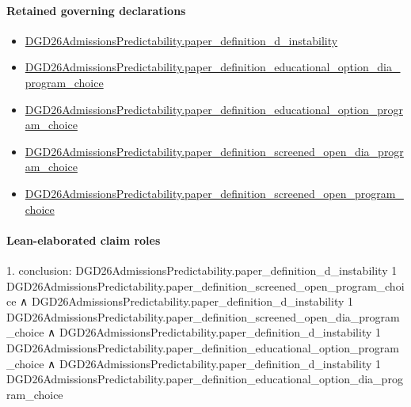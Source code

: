 \documentclass[10pt]{article}
\begin{document}
\paragraph{Retained governing declarations}
\begin{itemize}\raggedright
\item \hyperlink{governing-declaration-ce2c1c7a5233a84a}{DGD26\allowbreak{}Admissions\allowbreak{}Predictability.\allowbreak{}paper\_\allowbreak{}definition\_\allowbreak{}d\_\allowbreak{}instability}
\item \hyperlink{governing-declaration-9292267e580ba2d6}{DGD26\allowbreak{}Admissions\allowbreak{}Predictability.\allowbreak{}paper\_\allowbreak{}definition\_\allowbreak{}educational\_\allowbreak{}option\_\allowbreak{}dia\_\allowbreak{}program\_\allowbreak{}choice}
\item \hyperlink{governing-declaration-7e703b7870b50054}{DGD26\allowbreak{}Admissions\allowbreak{}Predictability.\allowbreak{}paper\_\allowbreak{}definition\_\allowbreak{}educational\_\allowbreak{}option\_\allowbreak{}program\_\allowbreak{}choice}
\item \hyperlink{governing-declaration-0632e040f3de5b52}{DGD26\allowbreak{}Admissions\allowbreak{}Predictability.\allowbreak{}paper\_\allowbreak{}definition\_\allowbreak{}screened\_\allowbreak{}open\_\allowbreak{}dia\_\allowbreak{}program\_\allowbreak{}choice}
\item \hyperlink{governing-declaration-2a1d5642d4371781}{DGD26\allowbreak{}Admissions\allowbreak{}Predictability.\allowbreak{}paper\_\allowbreak{}definition\_\allowbreak{}screened\_\allowbreak{}open\_\allowbreak{}program\_\allowbreak{}choice}
\end{itemize}
\paragraph{Lean-elaborated claim roles}\begin{ReviewVerbatim}
1. conclusion: DGD26AdmissionsPredictability.paper_definition_d_instability 1
    DGD26AdmissionsPredictability.paper_definition_screened_open_program_choice ∧
  DGD26AdmissionsPredictability.paper_definition_d_instability 1
      DGD26AdmissionsPredictability.paper_definition_screened_open_dia_program_choice ∧
    DGD26AdmissionsPredictability.paper_definition_d_instability 1
        DGD26AdmissionsPredictability.paper_definition_educational_option_program_choice ∧
      DGD26AdmissionsPredictability.paper_definition_d_instability 1
        DGD26AdmissionsPredictability.paper_definition_educational_option_dia_program_choice
\end{ReviewVerbatim}
\end{document}
